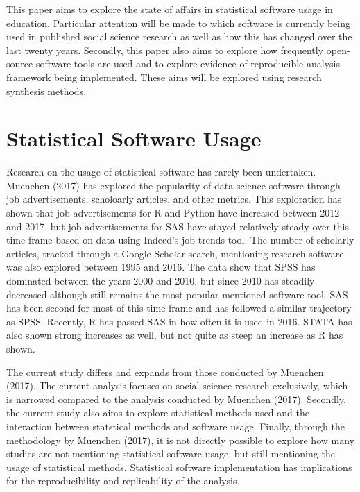 \documentclass[english,,man]{apa6}
\theoremstyle{definition}
\theoremstyle{definition}
\theoremstyle{definition}
\theoremstyle{remark}
\begin{document}
This paper aims to explore the state of affairs in statistical software
usage in education. Particular attention will be made to which software
is currently being used in published social science research as well as
how this has changed over the last twenty years. Secondly, this paper
also aims to explore how frequently open-source software tools are used
and to explore evidence of reproducible analysis framework being
implemented. These aims will be explored using research synthesis
methods.

\hypertarget{statistical-software-usage}{%
\section{Statistical Software Usage}\label{statistical-software-usage}}

Research on the usage of statistical software has rarely been
undertaken. Muenchen (2017) has explored the popularity of data science
software through job advertisements, scholoarly articles, and other
metrics. This exploration has shown that job advertisements for R and
Python have increased between 2012 and 2017, but job advertisements for
SAS have stayed relatively steady over this time frame based on data
using Indeed's job trends tool. The number of scholarly articles,
tracked through a Google Scholar search, mentioning research software
was also explored between 1995 and 2016. The data show that SPSS has
dominated between the years 2000 and 2010, but since 2010 has steadily
decreased although still remains the most popular mentioned software
tool. SAS has been second for most of this time frame and has followed a
similar trajectory as SPSS. Recently, R has passed SAS in how often it
is used in 2016. STATA has also shown strong increases as well, but not
quite as steep an increase as R has shown.

The current study differs and expands from those conducted by Muenchen
(2017). The current analysis focuses on social science research
exclusively, which is narrowed compared to the analysis conducted by
Muenchen (2017). Secondly, the current study also aims to explore
statistical methods used and the interaction between statstical methods
and software usage. Finally, through the methodology by Muenchen (2017),
it is not directly possible to explore how many studies are not
mentioning statistical software usage, but still mentioning the usage of
statistical methods. Statistical software implementation has
implications for the reproducibility and replicability of the analysis.
\end{document}

